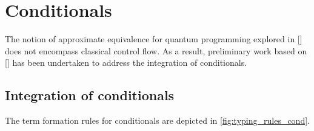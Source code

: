 \section{Conditionals}

The notion of approximate equivalence for quantum programming explored in [\cite{dahlqvist2022syntactic}] does not encompass classical control flow. As a result, preliminary work based on [\cite{crole1993categories,selinger2013lecture}]   has been undertaken to address the integration of conditionals. 

\subsection{Integration of conditionals}

The term formation rules for conditionals are depicted in
\autoref{fig:typing_rules_cond}. 

